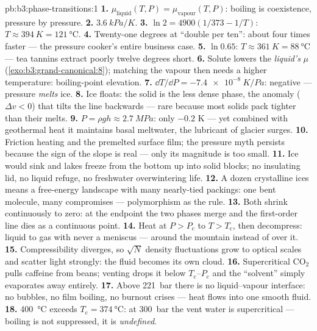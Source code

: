 \begin{solution}{pb:b3:phase-transitions:1}
\textbf{1.} $\mu_{\text{liquid}}(T, P) = \mu_{\text{vapour}}(T,
P)$: boiling is coexistence, pressure by pressure.
\textbf{2.} $\qty{3.6}{kPa/K}$.
\textbf{3.} $\ln2 = 4900(1/373 - 1/T)$: $T \approx \qty{394}{K} =
\qty{121}{\celsius}$.
\textbf{4.} Twenty-one degrees at ``double per ten'': about four
times faster --- the pressure cooker's entire business case.
\textbf{5.} $\ln0.65$: $T \approx \qty{361}{K} =
\qty{88}{\celsius}$ --- tea tannins extract poorly twelve degrees
short.
\textbf{6.} Solute lowers the \emph{liquid's} $\mu$
(\cref{exo:b3:grand-canonical:8}); matching the vapour then needs
a higher temperature: boiling-point elevation.
\textbf{7.} $\dd T/\dd P = \qty{-7.4e-8}{K/Pa}$: negative ---
pressure \emph{melts} ice.
\textbf{8.} Ice floats: the solid is the less dense phase, the
anomaly ($\Delta v < 0$) that tilts the line backwards --- rare
because most solids pack tighter than their melts.
\textbf{9.} $P = \rho gh \approx \qty{2.7}{MPa}$: only
$-0.2$ K --- yet combined with geothermal heat it maintains basal
meltwater, the lubricant of glacier surges.
\textbf{10.} Friction heating and the premelted surface film;
the pressure myth persists because the sign of the slope is real
--- only its magnitude is too small.
\textbf{11.} Ice would sink and lakes freeze from the bottom up
into solid blocks; no insulating lid, no liquid refuge, no
freshwater overwintering life.
\textbf{12.} A dozen crystalline ices means a free-energy
landscape with many nearly-tied packings: one bent molecule,
many compromises --- polymorphism as the rule.
\textbf{13.} Both shrink continuously to zero: at the endpoint
the two phases merge and the first-order line dies as a
continuous point.
\textbf{14.} Heat at $P > P_{\text{c}}$ to $T > T_{\text{c}}$,
then decompress: liquid to gas with never a meniscus --- around
the mountain instead of over it.
\textbf{15.} Compressibility diverges, so $\sqrt N$ density
fluctuations grow to optical scales and scatter light strongly:
the fluid becomes its own cloud.
\textbf{16.} Supercritical CO$_2$ pulls caffeine from beans;
venting drops it below $T_{\text{c}}$--$P_{\text{c}}$ and the
``solvent'' simply evaporates away entirely.
\textbf{17.} Above \qty{221}{bar} there is no liquid--vapour
interface: no bubbles, no film boiling, no burnout crises ---
heat flows into one smooth fluid.
\textbf{18.} \qty{400}{\celsius} exceeds $T_{\text{c}} =
\qty{374}{\celsius}$: at \qty{300}{bar} the vent water is
supercritical --- boiling is not suppressed, it is
\emph{undefined}.

\end{solution}
